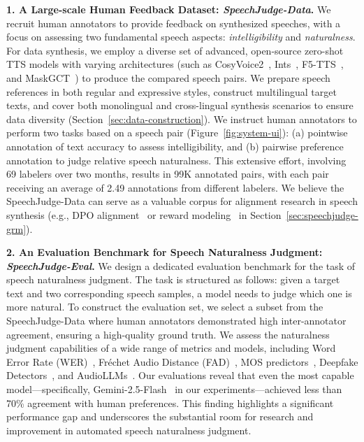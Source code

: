 \documentclass[]{bytedance_seed}
\begin{document}
\textbf{1. A Large-scale Human Feedback Dataset: \textit{SpeechJudge-Data}.}
We recruit human annotators to provide feedback on synthesized speeches, with a focus on assessing two fundamental speech aspects: \textit{intelligibility} and \textit{naturalness}. For data synthesis, we employ a diverse set of advanced, open-source zero-shot TTS models with varying architectures (such as CosyVoice2~\citep{cosyvoice2}, Ints~\citep{intp}, F5-TTS~\citep{f5tts}, and MaskGCT~\citep{maskgct}) to produce the compared speech pairs. We prepare speech references in both regular and expressive styles, construct multilingual target texts, and cover both monolingual and cross-lingual synthesis scenarios to ensure data diversity (Section~\ref{sec:data-construction}). We instruct human annotators to perform two tasks based on a speech pair (Figure~\ref{fig:system-ui}): (a) pointwise annotation of text accuracy to assess intelligibility, and (b) pairwise preference annotation to judge relative speech naturalness. This extensive effort, involving 69 labelers over two months, results in 99K annotated pairs, with each pair receiving an average of 2.49 annotations from different labelers. We believe the SpeechJudge-Data can serve as a valuable corpus for alignment research in speech synthesis (e.g., DPO alignment~\citep{dpo} or reward modeling~\citep{openai-rm,instructgpt,RLHF-anthoropic} in Section~\ref{sec:speechjudge-grm}).

\textbf{2. An Evaluation Benchmark for Speech Naturalness Judgment: \textit{SpeechJudge-Eval}.}
We design a dedicated evaluation benchmark for the task of speech naturalness judgment. The task is structured as follows: given a target text and two corresponding speech samples, a model needs to judge which one is more natural. To construct the evaluation set, we select a subset from the SpeechJudge-Data where human annotators demonstrated high inter-annotator agreement, ensuring a high-quality ground truth. We assess the naturalness judgment capabilities of a wide range of metrics and models, including Word Error Rate (WER)~\citep{whisper,funasr}, Fréchet Audio Distance (FAD)~\citep{fad}, MOS predictors~\citep{utmos,dnsmos,meta-audiobox-aesthetics}, Deepfake Detectors~\citep{aasist,audio-deepfake-verification}, and AudioLLMs~\citep{qwen2.5-omni,kimi-audio,mimoaudio,gemini2.5,gpt4o}. Our evaluations reveal that even the most capable model—specifically, Gemini-2.5-Flash~\citep{gemini2.5} in our experiments—achieved less than 70\% agreement with human preferences. This finding highlights a significant performance gap and underscores the substantial room for research and improvement in automated speech naturalness judgment.
\end{document}
